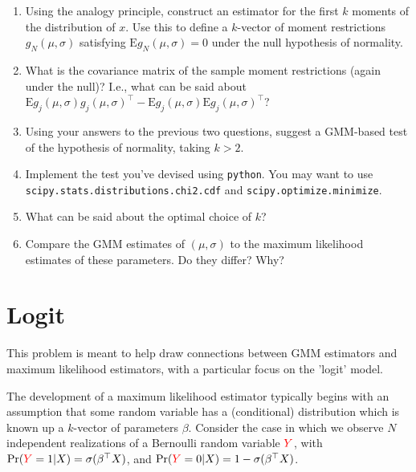 \documentclass[12pt]{amsart}
\newcommand{\T}{\top}
\newcommand{\rv}[1]{\ensuremath{\textcolor{red}{#1}{}}}
\newcommand{\rvY}{\rv{Y}}
\begin{document}
\begin{enumerate}
\item Using the analogy principle, construct an estimator for the first
\(k\) moments of the distribution of \(x\).  Use this to define a
\(k\)-vector of moment restrictions \(g_N(\mu,\sigma)\) satisfying
\(\mbox{E} g_N(\mu,\sigma) = 0\) under the null hypothesis of normality.
\item What is the covariance matrix of the sample moment restrictions
(again under the null)?
I.e., what can be said about \(\mbox{E} g_j(\mu,\sigma) g_j(\mu,\sigma)^\T - \mbox{E} g_j(\mu,\sigma) \mbox{E} g_j(\mu,\sigma)^\T\)?
\item Using your answers to the previous two questions, suggest a
GMM-based test of the hypothesis of normality, taking \(k>2\).
\item Implement the test you've devised using \texttt{python}.  You may want
to use \texttt{scipy.stats.distributions.chi2.cdf} and \texttt{scipy.optimize.minimize}.
\item What can be said about the optimal choice of \(k\)?
\item Compare the GMM estimates of \((\mu,\sigma)\) to the maximum
likelihood estimates of these parameters.  Do they differ?  Why?
\end{enumerate}
\section{Logit}
\label{sec:org5df0994}
This problem is meant to help draw connections between GMM estimators and maximum likelihood estimators, with a particular focus on the 'logit' model.

The development of a maximum likelihood estimator typically begins with an assumption that some random variable has a (conditional) distribution which is known up a \(k\)-vector of parameters \(\beta\).
Consider the case in which we observe \(N\) independent realizations of a Bernoulli random variable \(\rvY\), with \(\mbox{Pr}(\rvY=1|X) = \sigma(\beta^\T X)\), and \(\mbox{Pr}(\rvY=0|X) = 1-\sigma(\beta^\T X)\).
\end{document}
